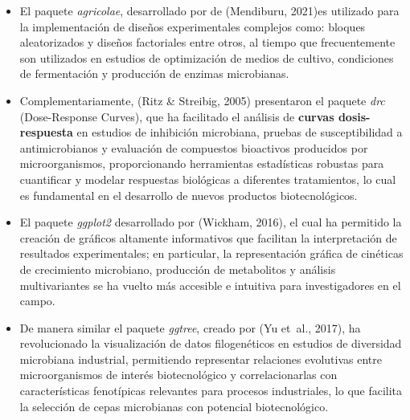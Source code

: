 \documentclass[
  spanish,
  letterpaper,
  DIV=11,
  numbers=noendperiod]{scrreprt}
\begin{document}
\begin{itemize}
\item
  El paquete \emph{agricolae}, desarrollado por de (Mendiburu, 2021)es
  utilizado para la implementación de diseños experimentales complejos
  como: bloques aleatorizados y diseños factoriales entre otros, al
  tiempo que frecuentemente son utilizados en estudios de optimización
  de medios de cultivo, condiciones de fermentación y producción de
  enzimas microbianas.
\item
  Complementariamente, (Ritz \& Streibig, 2005) presentaron el paquete
  \emph{drc} (Dose-Response Curves), que ha facilitado el análisis de
  \textbf{curvas dosis-respuesta} en estudios de inhibición microbiana,
  pruebas de susceptibilidad a antimicrobianos y evaluación de
  compuestos bioactivos producidos por microorganismos, proporcionando
  herramientas estadísticas robustas para cuantificar y modelar
  respuestas biológicas a diferentes tratamientos, lo cual es
  fundamental en el desarrollo de nuevos productos biotecnológicos.
\item
  El paquete \emph{ggplot2} desarrollado por (Wickham, 2016), el cual ha
  permitido la creación de gráficos altamente informativos que facilitan
  la interpretación de resultados experimentales; en particular, la
  representación gráfica de cinéticas de crecimiento microbiano,
  producción de metabolitos y análisis multivariantes se ha vuelto más
  accesible e intuitiva para investigadores en el campo.
\item
  De manera similar el paquete \emph{ggtree}, creado por (Yu et~al.,
  2017), ha revolucionado la visualización de datos filogenéticos en
  estudios de diversidad microbiana industrial, permitiendo representar
  relaciones evolutivas entre microorganismos de interés biotecnológico
  y correlacionarlas con características fenotípicas relevantes para
  procesos industriales, lo que facilita la selección de cepas
  microbianas con potencial biotecnológico.
\end{itemize}
\end{document}
